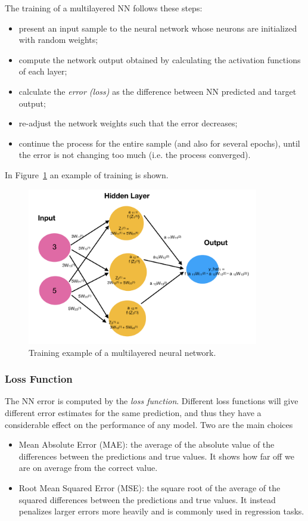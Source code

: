 The training of a multilayered NN follows these steps:

\begin{itemize}
\tightlist
\item present an input sample to the neural network whose neurons are initialized with random weights;
\item compute the network output obtained by calculating the activation functions of each layer;
\item calculate the \emph{error (loss)} as the difference between NN predicted and target output;
\item re-adjust the network weights such that the error decreases;
\item continue the process for the entire sample (and also for several epochs), until the error is not changing too much (i.e. the process converged).
\end{itemize}
In Figure~\ref{fig:training} an example of training is shown.

\begin{figure}[htb]
\centering
\includegraphics[width=0.9\textwidth]{figures/training_nn}
\caption{Training example of a multilayered neural network.}
\label{fig:training}
\end{figure}

\subsubsection{Loss Function}
The NN error is computed by the \emph{loss function}. Different loss functions will give different error estimates for the same prediction, and thus they have a considerable effect on the performance of any model. Two are the main choices

\begin{itemize}
\tightlist
\item Mean Absolute Error (MAE): the average of the absolute value of the differences between the predictions and true values. It shows how far off we are on average from the correct value. 
\item Root Mean Squared Error (MSE): the square root of the average of the squared differences between the predictions and true values. It instead penalizes larger errors more heavily and is commonly used in regression tasks. 
\end{itemize}


